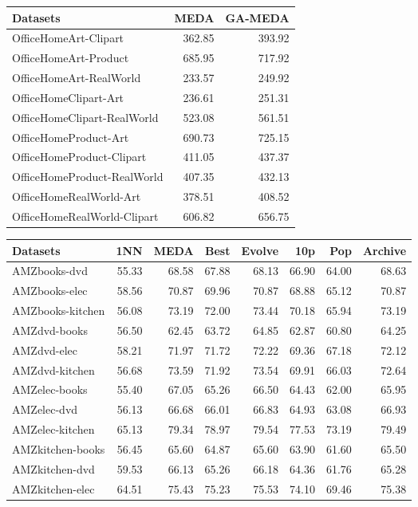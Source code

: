 \documentclass[a4paper]{article}
\begin{document}
	\begin{tabular}{lrr}
		\toprule
		Datasets &    MEDA &  GA-MEDA \\
		\midrule
		OfficeHomeArt-Clipart &  362.85 &   393.92 \\
		OfficeHomeArt-Product &  685.95 &   717.92 \\
		OfficeHomeArt-RealWorld &  233.57 &   249.92 \\
		OfficeHomeClipart-Art &  236.61 &   251.31 \\
		OfficeHomeClipart-RealWorld &  523.08 &   561.51 \\
		OfficeHomeProduct-Art &  690.73 &   725.15 \\
		OfficeHomeProduct-Clipart &  411.05 &   437.37 \\
		OfficeHomeProduct-RealWorld &  407.35 &   432.13 \\
		OfficeHomeRealWorld-Art &  378.51 &   408.52 \\
		OfficeHomeRealWorld-Clipart &  606.82 &   656.75 \\
		\bottomrule
	\end{tabular}
	
	\begin{tabular}{lrrrrrrr}
		\toprule
		Datasets &    1NN &   MEDA &   Best &  Evolve &    10p &    Pop &  Archive \\
		\midrule
		AMZbooks-dvd &  55.33 &  68.58 &  67.88 &   68.13 &  66.90 &  64.00 &    68.63 \\
		AMZbooks-elec &  58.56 &  70.87 &  69.96 &   70.87 &  68.88 &  65.12 &    70.87 \\
		AMZbooks-kitchen &  56.08 &  73.19 &  72.00 &   73.44 &  70.18 &  65.94 &    73.19 \\
		AMZdvd-books &  56.50 &  62.45 &  63.72 &   64.85 &  62.87 &  60.80 &    64.25 \\
		AMZdvd-elec &  58.21 &  71.97 &  71.72 &   72.22 &  69.36 &  67.18 &    72.12 \\
		AMZdvd-kitchen &  56.68 &  73.59 &  71.92 &   73.54 &  69.91 &  66.03 &    72.64 \\
		AMZelec-books &  55.40 &  67.05 &  65.26 &   66.50 &  64.43 &  62.00 &    65.95 \\
		AMZelec-dvd &  56.13 &  66.68 &  66.01 &   66.83 &  64.93 &  63.08 &    66.93 \\
		AMZelec-kitchen &  65.13 &  79.34 &  78.97 &   79.54 &  77.53 &  73.19 &    79.49 \\
		AMZkitchen-books &  56.45 &  65.60 &  64.87 &   65.60 &  63.90 &  61.60 &    65.50 \\
		AMZkitchen-dvd &  59.53 &  66.13 &  65.26 &   66.18 &  64.36 &  61.76 &    65.28 \\
		AMZkitchen-elec &  64.51 &  75.43 &  75.23 &   75.53 &  74.10 &  69.46 &    75.38 \\
		\bottomrule
	\end{tabular}
	
\end{document}
